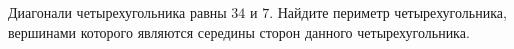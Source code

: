 \begin{ex}
	\begin{condition}
		Диагонали четырехугольника равны \( 34  \) и \( 7 \). Найдите периметр четырехугольника, вершинами которого являются середины сторон данного четырехугольника.
	\end{condition}
\end{ex}